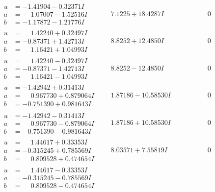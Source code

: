 \documentclass[1p]{elsarticle_modified}
\theoremstyle{definition}
\begin{document}
$$\begin{array}{c|c|c}
\begin{aligned}
u &= -1.41904 - 0.32371 I \\
a &= \phantom{-}1.07007 - 1.52516 I \\
b &= -1.17872 - 1.21776 I\end{aligned}
 & \phantom{-}7.1225 + 18.4287 I & \phantom{-0.000000 } 0 \\ \hline\begin{aligned}
u &= \phantom{-}1.42240 + 0.32497 I \\
a &= -0.87371 + 1.42713 I \\
b &= \phantom{-}1.16421 + 1.04993 I\end{aligned}
 & \phantom{-}8.8252 + 12.4850 I & \phantom{-0.000000 } 0 \\ \hline\begin{aligned}
u &= \phantom{-}1.42240 - 0.32497 I \\
a &= -0.87371 - 1.42713 I \\
b &= \phantom{-}1.16421 - 1.04993 I\end{aligned}
 & \phantom{-}8.8252 - 12.4850 I & \phantom{-0.000000 } 0 \\ \hline\begin{aligned}
u &= -1.42942 + 0.31413 I \\
a &= \phantom{-}0.967730 + 0.879064 I \\
b &= -0.751390 + 0.981643 I\end{aligned}
 & \phantom{-}1.87186 - 10.58530 I & \phantom{-0.000000 } 0 \\ \hline\begin{aligned}
u &= -1.42942 - 0.31413 I \\
a &= \phantom{-}0.967730 - 0.879064 I \\
b &= -0.751390 - 0.981643 I\end{aligned}
 & \phantom{-}1.87186 + 10.58530 I & \phantom{-0.000000 } 0 \\ \hline\begin{aligned}
u &= \phantom{-}1.44617 + 0.33353 I \\
a &= -0.315245 + 0.785569 I \\
b &= \phantom{-}0.809528 + 0.474654 I\end{aligned}
 & \phantom{-}8.03571 + 7.55819 I & \phantom{-0.000000 } 0 \\ \hline\begin{aligned}
u &= \phantom{-}1.44617 - 0.33353 I \\
a &= -0.315245 - 0.785569 I \\
b &= \phantom{-}0.809528 - 0.474654 I\end{aligned}

\end{array}$$
\end{document}
